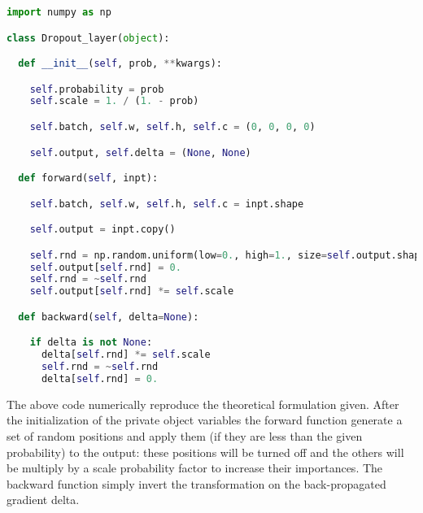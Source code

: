 \documentclass{standalone}
\begin{document}
\lstset{style=snippet}
\begin{lstlisting}[language=Python, caption=NumPyNet version of Dropout function, label=code:py_dropout]
import numpy as np

class Dropout_layer(object):

  def __init__(self, prob, **kwargs):

    self.probability = prob
    self.scale = 1. / (1. - prob)

    self.batch, self.w, self.h, self.c = (0, 0, 0, 0)

    self.output, self.delta = (None, None)

  def forward(self, inpt):

    self.batch, self.w, self.h, self.c = inpt.shape

    self.output = inpt.copy()

    self.rnd = np.random.uniform(low=0., high=1., size=self.output.shape) < self.probability
    self.output[self.rnd] = 0.
    self.rnd = ~self.rnd
    self.output[self.rnd] *= self.scale

  def backward(self, delta=None):

    if delta is not None:
      delta[self.rnd] *= self.scale
      self.rnd = ~self.rnd
      delta[self.rnd] = 0.

\end{lstlisting}

The above code numerically reproduce the theoretical formulation given.
After the initialization of the private object variables the forward function generate a set of random positions and apply them (if they are less than the given probability) to the output: these positions will be turned off and the others will be multiply by a scale probability factor to increase their importances.
The backward function simply invert the transformation on the back-propagated gradient \textsf{delta}.
\end{document}
